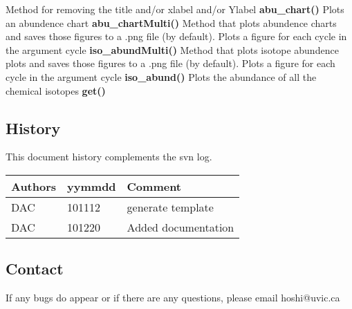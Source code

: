 Method for removing the title and/or xlabel and/or Ylabel \newline
{\bf abu\_chart()}\newline 
Plots an abundence chart\newline
{\bf abu\_chartMulti()}\newline 
Method that plots abundence charts and saves those figures to a .png file (by default). Plots a figure for each cycle in the argument cycle\newline
{\bf iso\_abundMulti()}\newline 
Method that plots isotope abundence plots and saves those figures to a .png file (by default). Plots a figure for each cycle in the argument cycle\newline
{\bf iso\_abund()}\newline 
Plots the abundance of all the chemical isotopes
{\bf get()}\newline 
		
\subsection{History} 
This document history complements the svn log.

\begin{tabular*}{\textwidth}{lll}
\hline
Authors & yymmdd & Comment \\
\hline
DAC & 101112 & generate template \\
DAC & 101220 & Added documentation \\
\hline
\end{tabular*}


\subsection{Contact}
If any bugs do appear or if there are any questions, please email hoshi@uvic.ca
\begin{verbatim}

\end{verbatim}


%
%
%
%
